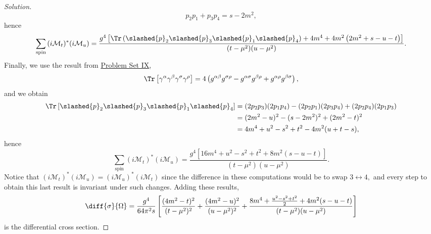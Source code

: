 \begin{proof}[Solution]
\begin{equation*}
       p_2 p_1 + p_3 p_4 = s - 2m^2,
   \end{equation*}
   hence
   \begin{equation*}
       \sum_{\mathrm{spin}}{(i\mathcal{M}_t)^*(i\mathcal{M}_u)} = \frac{g^4\left[\Tr\left(\slashed{p}_2 \slashed{p}_3 \slashed{p}_1 \slashed{p}_4\right) + 4m^4 + 4m^2\left(2m^2 + s - u - t\right)\right]}{(t - \mu^2)(u - \mu^2)}.
   \end{equation*}
   Finally, we use the result from \href{https://github.com/louisradial/4305107-quantum-field-theory-i/releases/tag/pset9}{Problem Set IX},
   \begin{equation*}
       \Tr\left[\gamma^{\alpha} \gamma^\beta \gamma^\sigma \gamma^\rho\right] = 4 \left(g^{\alpha \beta} g^{\sigma \rho} - g^{\alpha \sigma} g^{\beta \rho} + g^{\alpha \rho}g^{\beta \sigma}\right),
   \end{equation*}
   and we obtain
   \begin{align*}
       \Tr\left[\slashed{p}_2 \slashed{p}_3 \slashed{p}_1 \slashed{p}_4\right] 
       &= (2p_2 p_3) (2p_1 p_4) - (2p_2 p_1) (2p_3 p_4) + (2p_2 p_4)(2p_1 p_3)\\
       &= (2m^2 - u)^2 - (s - 2m^2)^2 + (2m^2 - t)^2\\
       &= 4m^4 + u^2 - s^2 + t^2 - 4m^2(u + t - s),
   \end{align*}
   hence
   \begin{equation*}
       \sum_{\mathrm{spin}}{(i\mathcal{M}_t)^*(i\mathcal{M}_u)} = \frac{g^4\left[16m^4 + u^2 - s^2 + t^2 + 8m^2\left(s - u - t\right)\right]}{(t - \mu^2)(u - \mu^2)}.
   \end{equation*}
   Notice that \((i\mathcal{M}_t)^* (i \mathcal{M}_u) = (i\mathcal{M}_u)^* (i \mathcal{M}_t)\) since the difference in these computations would be to swap \(3 \leftrightarrow 4,\) and every step to obtain this last result is invariant under such changes. Adding these results, 
   \begin{equation*}
       \diff{\sigma}{\Omega} = \frac{g^4}{64 \pi^2 s}\left[\frac{(4m^2 - t)^2}{(t - \mu^2)^2} + \frac{(4m^2 - u)^2}{(u - \mu^2)^2} + \frac{8m^4 + \frac{u^2 - s^2 + t^2}{2} + 4m^2(s - u - t)}{(t - \mu^2)(u - \mu^2)}\right]
   \end{equation*}
   is the differential cross section.
\end{proof}
